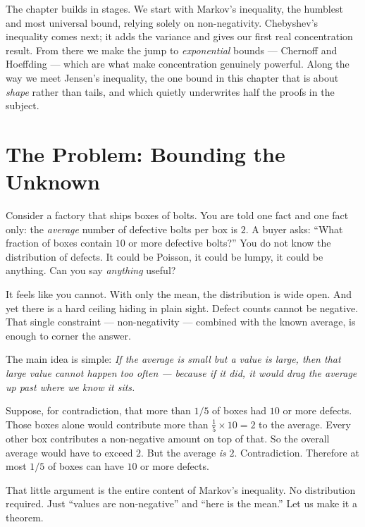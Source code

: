 The chapter builds in stages. We start with Markov's inequality, the humblest
and most universal bound, relying solely on non-negativity.
Chebyshev's inequality comes next; it adds the variance and gives our first
real concentration result. From there we make the jump to \emph{exponential}
bounds --- Chernoff and Hoeffding --- which are what make concentration
genuinely powerful. Along the way we meet Jensen's inequality, the one bound in
this chapter that is about \emph{shape} rather than tails, and which quietly
underwrites half the proofs in the subject.

\chapterline

\section{The Problem: Bounding the Unknown}
\label{ch19:problem}

Consider a factory that ships boxes of bolts. You are told one fact and one fact only: the
\emph{average} number of defective bolts per box is $2$. A buyer asks: ``What
fraction of boxes contain $10$ or more defective bolts?'' You do not know the
distribution of defects. It could be Poisson, it could be lumpy, it could be
anything. Can you say \emph{anything} useful?

It feels like you cannot. With only the mean, the distribution is wide open.
And yet there is a hard ceiling hiding in plain sight. Defect counts cannot be
negative. That single constraint --- non-negativity --- combined with the
known average, is enough to corner the answer.

\begin{intuitionbox}
The main idea is simple: \emph{If the average is small but a
value is large, then that large value cannot happen too often --- because if
it did, it would drag the average up past where we know it sits.}

Suppose, for contradiction, that more than $1/5$ of boxes had $10$ or more
defects. Those boxes alone would contribute more than $\tfrac15 \times 10 = 2$
to the average. Every other box contributes a non-negative amount on top of
that. So the overall average would have to exceed $2$. But the average
\emph{is} $2$. Contradiction. Therefore at most $1/5$ of boxes can have $10$
or more defects.
\end{intuitionbox}

That little argument is the entire content of Markov's inequality. No
distribution required. Just ``values are non-negative'' and ``here is the
mean.'' Let us make it a theorem.

